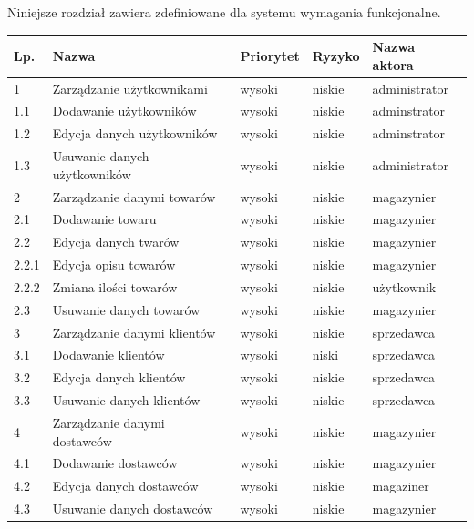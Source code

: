 Niniejsze rozdział zawiera zdefiniowane dla systemu wymagania funkcjonalne.


\begin{table}[ht]
	 \begin{center}
	    \begin{tabular}{| l | l | l | l | l |}%
	    	\hline
		    \textbf{Lp.} & \textbf{Nazwa}  & \textbf{Priorytet} & \textbf{Ryzyko} &
		    \textbf{Nazwa aktora} \\
		    \hline
		    1 & Zarządzanie użytkownikami & wysoki & niskie & administrator \\
		    1.1 & Dodawanie użytkowników & wysoki & niskie & adminstrator \\
		    1.2 & Edycja danych użytkowników & wysoki & niskie & adminstrator \\ 	
		    1.3 & Usuwanie danych użytkowników & wysoki &niskie & administrator \\
		    \hline
		    2 & Zarządzanie danymi towarów & wysoki & niskie & magazynier \\
		    2.1 & Dodawanie towaru & wysoki &  niskie & magazynier \\
		    2.2 & Edycja danych twarów & wysoki & niskie & magazynier \\
		    2.2.1 & Edycja opisu towarów & wysoki & niskie & magazynier \\
		    2.2.2 & Zmiana ilości towarów & wysoki & niskie & użytkownik \\
		    2.3 & Usuwanie danych towarów & wysoki & niskie & magazynier \\
		    \hline
		   	3 & Zarządzanie danymi klientów & wysoki & niskie & sprzedawca \\
		   	3.1 & Dodawanie klientów & wysoki & niski & sprzedawca \\
		   	3.2 & Edycja danych klientów & wysoki & niskie & sprzedawca \\
		   	3.3 & Usuwanie danych klientów & wysoki & niskie & sprzedawca \\
		   	\hline
		   	4 & Zarządzanie danymi dostawców & wysoki & niskie & magazynier \\
		   	4.1 & Dodawanie dostawców & wysoki & niskie & magazynier \\
		   	4.2 & Edycja danych dostawców & wysoki & niskie & magaziner \\
		   	4.3 & Usuwanie danych dostawców & wysoki & niskie & magazynier \\

\end{tabular}
\end{center}
\end{table}
